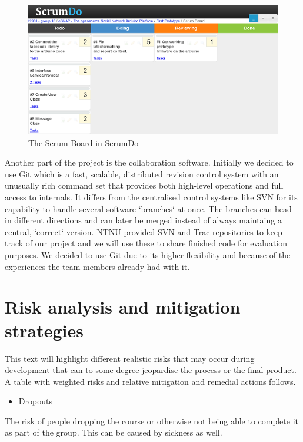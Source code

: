 \begin{figure}[h!]
\centering \includegraphics{img/management-scrumdo} \caption{The Scrum Board in ScrumDo}

\label{fig:management-scrumdo}
\end{figure}
	
Another part of the project is the collaboration software.
Initially we decided to use Git which is a fast, scalable,
distributed revision control system with an unusually rich command
set that provides both high-level operations and full access to internals.
It differs from the centralised control systems like SVN for its capability
to handle several software \char`\"{}branches\char`\"{} at once. The
branches can head in different directions and can later be merged
instead of always maintaing a central, \char`\"{}correct\char`\"{}
version. NTNU provided SVN and Trac repositories to keep track of our
project and we will use these to share finished code for evaluation
purposes. We decided to use Git due to its higher flexibility and because
of the experiences the team members already had with it.

\newpage
\section{Risk analysis and mitigation strategies}

This text will highlight different realistic risks that may occur during development
that can to some degree jeopardise the process or the final product.
A table with weighted risks and relative mitigation and remedial actions follows.

\begin{itemize}
\item Dropouts
\end{itemize}
The risk of people dropping the course or otherwise not being able to complete it as part
of the group. This can be caused by sickness as well.


